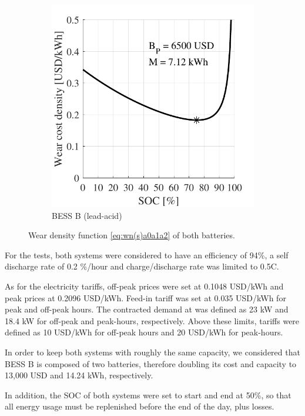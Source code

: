 \documentclass{ieeeaccess}
\begin{document}
\begin{figure}[!h]
\begin{subfigure}{.235\textwidth}
            \includegraphics[width=\linewidth]{figures/marginal_Rolls_8CH33P_lead-acid.pdf}
            \caption{BESS B (lead-acid)}
            \label{fig:wn_curves1B}
        \end{subfigure}
        \caption{Wear density function \eqref{eq:wn(s)a0a1a2} of both batteries.}
        \label{fig:wn_curves1}
    \end{figure}

    For the tests, both systems were considered to have an efficiency of 94\%, a self discharge rate of 0.2 \%/hour and charge/discharge rate was limited to 0.5C.

    As for the electricity tariffs, off-peak prices were set at 0.1048 USD/kWh and peak prices at 0.2096 USD/kWh. Feed-in tariff was set at 0.035 USD/kWh for peak and off-peak hours. The contracted demand at was defined as 23 kW and 18.4 kW for off-peak and peak-hours, respectively. Above these limits, tariffs were defined as 10 USD/kWh for off-peak hours and 20 USD/kWh for peak-hours.

    In order to keep both systems with roughly the same capacity, we considered that BESS B is composed of two batteries, therefore doubling its cost and capacity to 13,000 USD and 14.24 kWh, respectively.

    In addition, the SOC of both systems were set to start and end at 50\%, so that all energy usage must be replenished before the end of the day, plus losses.
\end{document}
